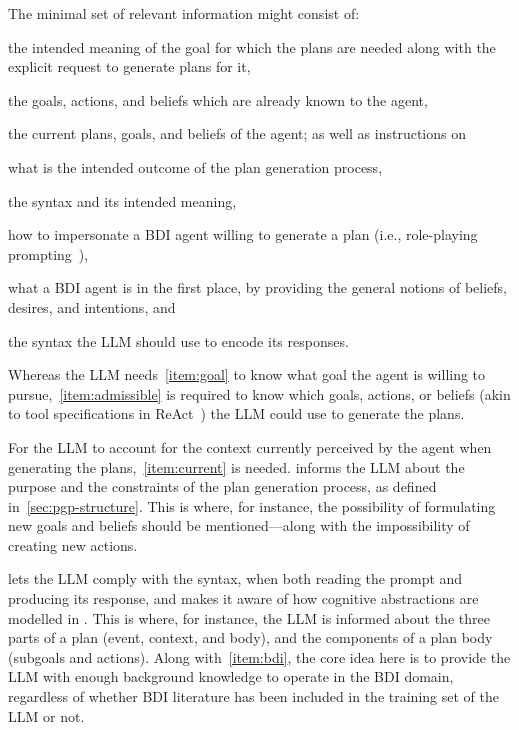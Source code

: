 \documentclass[12pt,a4paper,openright,twoside]{book}
\begin{document}
The minimal set of relevant information might consist of:
%
\begin{enumerate*}[label=\textbf{(I\arabic*)}]
    \item\label{item:goal} the intended meaning of the goal  for which the plans are needed along with the explicit request to generate plans for it,
    \item\label{item:admissible} the goals, actions, and beliefs which are already known to the agent,
    \item\label{item:current} the current plans, goals, and beliefs of the agent;
    as well as instructions on
    \item\label{item:pgp} what is the intended outcome of the plan generation process,
    \item\label{item:lang} the \agentspeak{} syntax and its intended meaning,
    \item\label{item:task} how to impersonate a \ac{BDI} agent willing to generate a plan
    (i.e., role-playing prompting~\cite{KongZCLQSSZ23}),
    \item\label{item:bdi} what a \ac{BDI} agent is in the first place, by providing the general notions of beliefs, desires, and intentions, and
    \item\label{item:syntax} the syntax the LLM should use to encode its responses.
\end{enumerate*}

Whereas the \ac{LLM} needs~\cref{item:goal} to know what goal the agent is willing to pursue,~\cref{item:admissible} is required to know which goals, actions, or beliefs (akin to tool specifications in \ac{ReAct}~\cite{YaoZYDSN023}) the \ac{LLM} could use to generate the plans.

For the \ac{LLM} to account for the context currently perceived by the agent when generating the plans,~\cref{item:current} is needed.
%
 informs the \ac{LLM} about the purpose and the constraints of the plan generation process, as defined in~\cref{sec:pgp-structure}.
%
This is where, for instance, the possibility of formulating new goals and beliefs should be mentioned---along with the impossibility of creating new actions.

 lets the \ac{LLM} comply with the \agentspeak{} syntax, when both reading the prompt and producing its response, and makes it aware of how cognitive abstractions are modelled in \agentspeak{}.
%
This is where, for instance, the \ac{LLM} is informed about the three parts of a plan (event, context, and body), and the components of a plan body (subgoals and actions).
%
Along with~\cref{item:bdi}, the core idea here is to provide the \ac{LLM} with enough background knowledge to operate in the \ac{BDI} domain, regardless of whether \ac{BDI} literature has been included in the training set of the \ac{LLM} or not.
\end{document}
